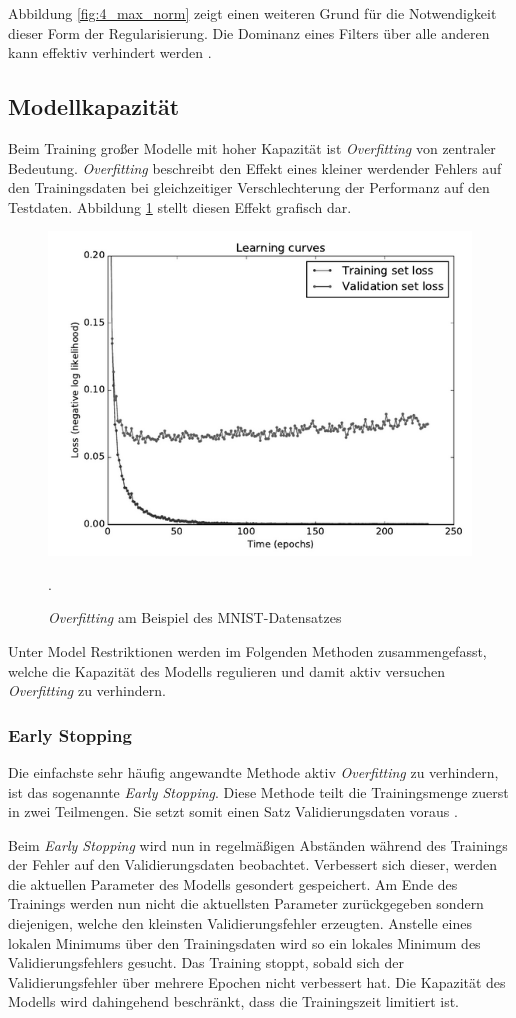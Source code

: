  Abbildung \ref{fig:4_max_norm} zeigt einen weiteren Grund für die Notwendigkeit dieser Form der Regularisierung. Die Dominanz eines Filters über alle anderen kann effektiv verhindert werden \cite[vgl.][]{Zeiler2014}.




\subsection{Modellkapazität}
Beim Training großer Modelle mit hoher Kapazität ist \textit{Overfitting} von zentraler Bedeutung. \textit{Overfitting} beschreibt den Effekt eines kleiner werdender Fehlers auf den Trainingsdaten bei gleichzeitiger Verschlechterung der Performanz auf den Testdaten. Abbildung \ref{fig:4_overfitting} stellt diesen Effekt grafisch dar.

\begin{figure}[H]
\centering
\includegraphics[width=0.4\linewidth]{images/4_overfitting}
\caption[]{\textit{Overfitting} am Beispiel des MNIST-Datensatzes \cite[siehe][Kap. 7.3, S. 216]{Bengio2015} }.
\label{fig:4_overfitting}
\end{figure}

Unter Model Restriktionen werden im Folgenden Methoden zusammengefasst, welche die Kapazität des Modells regulieren und damit aktiv versuchen \textit{Overfitting} zu verhindern.



\subsubsection{Early Stopping}
Die einfachste sehr häufig angewandte Methode aktiv \textit{Overfitting} zu verhindern, ist das sogenannte \textit{Early Stopping}. Diese Methode teilt die Trainingsmenge zuerst in zwei Teilmengen. Sie setzt somit einen Satz Validierungsdaten voraus \cite[vgl. im Folgenden][Kap. 7.3, S. 216 ff.]{Bengio2015}.

Beim \textit{Early Stopping} wird nun in regelmäßigen Abständen während des Trainings der Fehler auf den Validierungsdaten beobachtet. Verbessert sich dieser, werden die aktuellen Parameter des Modells gesondert gespeichert. Am Ende des Trainings werden nun nicht die aktuellsten Parameter zurück\-gegeben sondern diejenigen, welche den kleinsten Validierungsfehler erzeugten.
Anstelle eines lokalen Minimums über den Trainingsdaten wird so ein lokales Minimum des Validierungsfehlers gesucht. Das Training stoppt, sobald sich der Validierungsfehler über mehrere Epochen nicht verbessert hat. Die Kapazität des Modells wird dahingehend beschränkt, dass die Trainingszeit limitiert ist.

